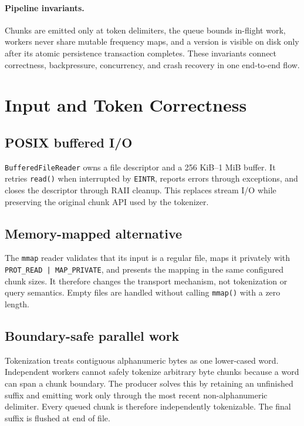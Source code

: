 \documentclass[11pt]{article}
\begin{document}
\paragraph{Pipeline invariants.}
Chunks are emitted only at token delimiters, the queue bounds in-flight work,
workers never share mutable frequency maps, and a version is visible on disk
only after its atomic persistence transaction completes. These invariants
connect correctness, backpressure, concurrency, and crash recovery in one
end-to-end flow.

\section{Input and Token Correctness}

\subsection{POSIX buffered I/O}

\texttt{BufferedFileReader} owns a file descriptor and a 256 KiB--1 MiB
buffer. It retries \texttt{read()} when interrupted by \texttt{EINTR}, reports
errors through exceptions, and closes the descriptor through RAII cleanup.
This replaces stream I/O while preserving the original chunk API used by the
tokenizer.

\subsection{Memory-mapped alternative}

The \texttt{mmap} reader validates that its input is a regular file, maps it
privately with \texttt{PROT\_READ | MAP\_PRIVATE}, and presents the mapping in
the same configured chunk sizes. It therefore changes the transport mechanism,
not tokenization or query semantics. Empty files are handled without calling
\texttt{mmap()} with a zero length.

\subsection{Boundary-safe parallel work}

Tokenization treats contiguous alphanumeric bytes as one lower-cased word.
Independent workers cannot safely tokenize arbitrary byte chunks because a word
can span a chunk boundary. The producer solves this by retaining an unfinished
suffix and emitting work only through the most recent non-alphanumeric
delimiter. Every queued chunk is therefore independently tokenizable. The
final suffix is flushed at end of file.
\end{document}
